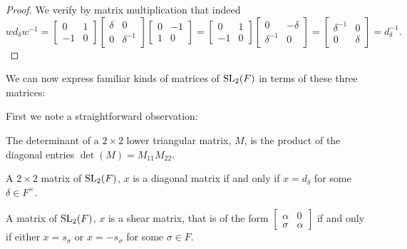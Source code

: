 \begin{proof} 
We verify by matrix multiplication that indeed
\begin{equation*}
w d_\delta w^{-1} = \begin{bmatrix} 0 & 1 \\ - 1 & 0 \end{bmatrix} \begin{bmatrix} \delta & 0 \\ 0 & \delta^{-1} \end{bmatrix} \begin{bmatrix} 0 & - 1 \\ 1 & 0 \end{bmatrix} =  \begin{bmatrix} 0 & 1 \\ - 1 & 0 \end{bmatrix} \begin{bmatrix} 0 & - \delta \\ \delta^{-1} & 0 \end{bmatrix} \! = \! \begin{bmatrix} \delta^{-1} & 0 \\ 0 & \delta \end{bmatrix} \!= d^{-1}_\delta. 
\end{equation*}
\end{proof}

We can now express familiar kinds of matrices of $\operatorname{SL}_2(F)$ in terms of these three matrices:

First we note a straightforward observation:
\begin{remark}
    \label{det_eq_mul_diag_of_lower_triangular}
    \leanok
    The determinant of a $2 \times 2$ lower triangular matrix, $M$, is the product of the diagonal entries $\det(M) = M_{11} M_{22}$.
\end{remark}


\begin{remark}
    \label{SpecialLinearGroup.fin_two_diagonal_iff}
    \leanok
    A $2 \times 2$ matrix of $\operatorname{SL}_2(F)$, $x$ is a diagonal matrix if and only if $x = d_\delta$ for some $\delta \in F^\times$.
\end{remark}

\begin{remark}
    \label{SpecialLinearGroup.fin_two_shear_iff}
    \leanok
    A matrix of $\operatorname{SL}_2(F)$, $x$ is a shear matrix, that is of the form $\begin{bmatrix}
        \alpha & 0\\
        \sigma & \alpha
    \end{bmatrix}$ if and only if either $x = s_\sigma$ or $x = - s_\sigma$ for some $\sigma \in F$.
\end{remark}

